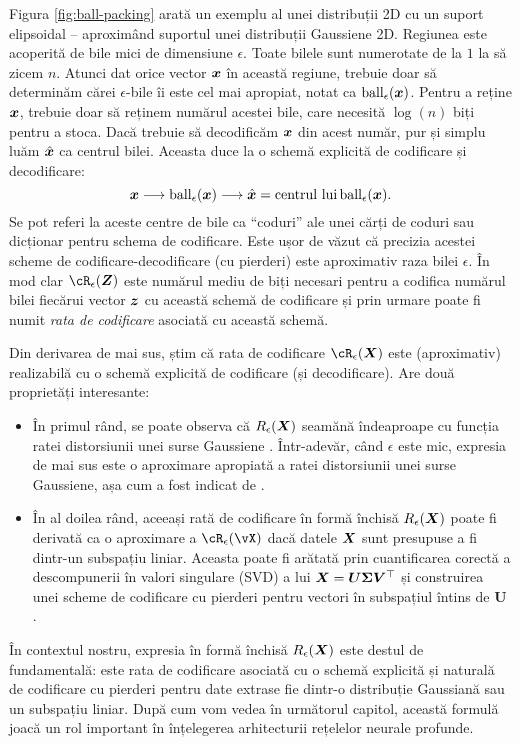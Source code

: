 \documentclass[../../book-main_ro.tex]{subfiles}
\begin{document}
\begin{example}
	Figura \ref{fig:ball-packing} arată un exemplu al unei distribuții 2D cu un suport elipsoidal -- aproximând suportul unei distribuții Gaussiene 2D. Regiunea este acoperită de bile mici de dimensiune $\epsilon$. Toate bilele sunt numerotate de la $1$ la să zicem $n$. Atunci dat orice vector $\bm{x}$ în această regiune, trebuie doar să determinăm cărei $\epsilon$-bile îi este cel mai apropiat, notat ca $\operatorname{ball}_{\epsilon}(\bm{x})$. Pentru a reține $\bm{x}$, trebuie doar să reținem numărul acestei bile, care necesită $\log(n)$ biți pentru a stoca. Dacă trebuie să decodificăm $\bm{x}$ din acest număr, pur și simplu luăm $\hat {\bm{x}}$ ca centrul bilei. Aceasta duce la o schemă explicită de codificare și decodificare:
	\begin{equation}
		\bm{x} \longrightarrow \operatorname{ball}_{\epsilon}(\bm{x}) \longrightarrow \hat {\bm{x}} = \mbox{centrul lui} \operatorname{ball}_{\epsilon}(\bm{x}).
	\end{equation}
	Se pot referi la aceste centre de bile ca ``coduri'' ale unei cărți de coduri sau dicționar pentru schema de codificare. Este ușor de văzut că precizia acestei scheme de codificare-decodificare (cu pierderi) este aproximativ raza bilei $\epsilon$.
	În mod clar $\cR_{\epsilon}(\Z)$ este numărul mediu de biți necesari pentru a codifica numărul bilei fiecărui vector $\bm{z}$ cu această schemă de codificare și prin urmare poate fi numit {\em rata de codificare} asociată cu această schemă.
\end{example}

Din derivarea de mai sus, știm că rata de codificare $\cR_{\epsilon}(\X)$ este (aproximativ) realizabilă cu o schemă explicită de codificare (și decodificare). Are două proprietăți interesante:
\begin{itemize}
	\item În primul rând, se poate observa că $R_{\epsilon}(\bm{X})$ seamănă îndeaproape cu funcția ratei distorsiunii unei surse Gaussiene \cite{Cover-Thomas}. Într-adevăr, când $\epsilon$ este mic, expresia de mai sus este o aproximare apropiată a ratei distorsiunii unei surse Gaussiene, așa cum a fost indicat de \cite{MaY2007-PAMI}.
	\item În al doilea rând, aceeași rată de codificare în formă închisă $R_{\epsilon}(\bm{X})$ poate fi derivată ca o aproximare a \(\cR_{\epsilon}(\vX)\) dacă datele $\bm{X}$ sunt presupuse a fi dintr-un subspațiu liniar. Aceasta poate fi arătată prin cuantificarea corectă a descompunerii în valori singulare (SVD) a lui $\bm{X} = \boldsymbol{U} \boldsymbol{\Sigma}\boldsymbol{V}^\top$ și construirea unei scheme de codificare cu pierderi pentru vectori în subspațiul întins de $\boldsymbol{U}$ \cite{MaY2007-PAMI}.
\end{itemize}
În contextul nostru, expresia în formă închisă $R_{\epsilon}(\bm{X})$ este destul de fundamentală: este rata de codificare asociată cu o schemă explicită și naturală de codificare cu pierderi pentru date extrase fie dintr-o distribuție Gaussiană sau un subspațiu liniar. După cum vom vedea în următorul capitol, această formulă joacă un rol important în înțelegerea arhitecturii rețelelor neurale profunde.
\end{document}
